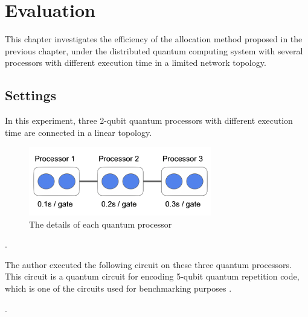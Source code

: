 \chapter{Evaluation}

This chapter investigates the efficiency of the allocation method proposed in the previous chapter, under the distributed quantum computing system with several processors with different execution time in a limited network topology.  
 
\section{Settings}
In this experiment, three 2-qubit quantum processors with different execution time are connected in a linear topology.
 
 \begin{figure}[ht]
  		\begin{center}
  			\includegraphics[width=8cm]{img/first_experiment.png}
			\caption{The details of each quantum processor}
		\end{center}
	\end{figure}.
 
 The author executed the following circuit on these three quantum processors.  This circuit is a quantum circuit for encoding 5-qubit quantum repetition code, which is one of the circuits used for benchmarking purposes \cite{QASMbench}.
 
  \begin{figure}[ht]
  	\begin{center}
	\end{center}
\end{figure}.


